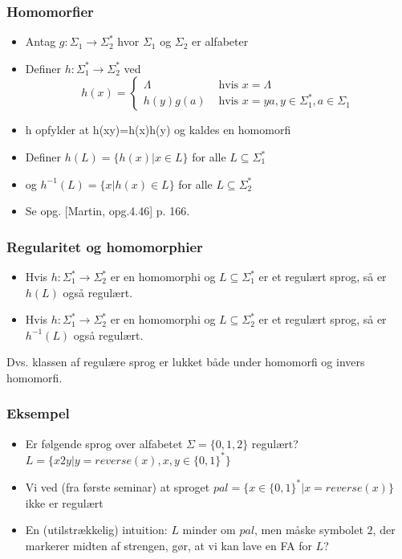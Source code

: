 \begin{frame}
\frametitle{Homomorfier}
\begin{itemize}[<+->]
\item Antag $g: \Sigma_1 \rightarrow \Sigma_2^*$ hvor $\Sigma_1$ og
  $\Sigma_2$ er alfabeter
\item  Definer  $h: \Sigma_1^* \rightarrow \Sigma_2^*$ ved 
   \[
   h(x) = \begin{cases}\Lambda &\text{ hvis }x=\Lambda \\
     h(y)g(a)  & \text{ hvis }x=ya, y\in\Sigma_1^*, a\in\Sigma_1
\end{cases}
   \]
\item  h opfylder at h(xy)=h(x)h(y) og kaldes en  
homomorfi 
\item  Definer  $h(L) = \{ h(x) | x\in L \}$  for alle $L\subseteq\Sigma_1^*$
\item  og $h^{-1}(L) = \{ x | h(x)\in L \}$  for alle $L\subseteq\Sigma_2^*$ 
\item Se opg. [Martin, opg.4.46] p. 166.
\end{itemize}
\end{frame}

\begin{frame}
\frametitle{Regularitet og homomorphier}
\begin{itemize}[<+->]
\item Hvis $h: \Sigma_1^* \rightarrow \Sigma_2^*$ er en homomorphi og
  $L\subseteq \Sigma_1^*$ er et regulært sprog, så er $h(L)$ også regulært.
\item Hvis $h: \Sigma_1^* \rightarrow \Sigma_2^*$ er en homomorphi og
  $L\subseteq \Sigma_2^*$ er et regulært sprog, så er $h^{-1}(L)$ også regulært.
\end{itemize}
Dvs. klassen af regulære sprog er lukket både under homomorfi og
invers homomorfi.
\end{frame}

\begin{frame}
\frametitle{Eksempel}
\begin{itemize}[<+->]
\item Er følgende sprog over alfabetet $\Sigma=\{0,1,2\}$ regulært?  
   $L = \{ x2y | y=reverse(x), x,y\in\{0,1\}^* \}$ 
\item  Vi ved (fra første seminar) at sproget  
   $pal = \{ x\in\{0,1\}^* | x=reverse(x) \}$  
ikke er regulært 
\item  En (utilstrækkelig) intuition: 
$L$ minder om $pal$, men måske symbolet $2$, der markerer  
midten af strengen, gør, at vi kan lave en FA for $L$?
\end{itemize}
\end{frame}

